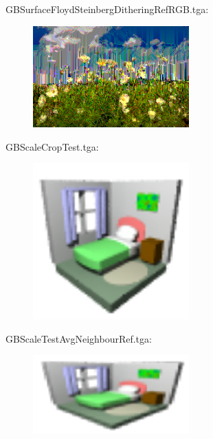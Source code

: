 GBSurfaceFloydSteinbergDitheringRefRGB.tga:\\
\begin{center}
\begin{figure}[H]
\centering\includegraphics[width=6cm]{./GBSurfaceFloydSteinbergDitheringRefRGB.png}\\
\end{figure}
\end{center}

GBScaleCropTest.tga:\\
\begin{center}
\begin{figure}[H]
\centering\includegraphics[width=6cm]{./GBScaleCropTest.png}\\
\end{figure}
\end{center}

GBScaleTestAvgNeighbourRef.tga:\\
\begin{center}
\begin{figure}[H]
\centering\includegraphics[width=6cm]{./GBScaleTestAvgNeighbourRef01.png}\\
\end{figure}
\end{center}


